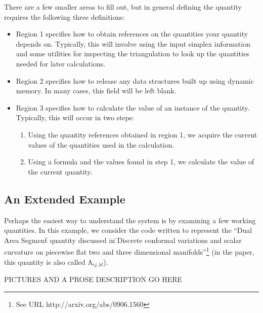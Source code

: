 There are a few smaller areas to fill out, but in general defining the
quantity requires the following three definitions:

\begin{itemize}
\item Region 1 specifies how to obtain references on the quantities your
quantity depends on. Typically, this will involve using the input simplex
information and some utilities for inspecting the triangulation to look up
the quantities needed for later calculations.

\item Region 2 specifies how to release any data structures built up using
dynamic memory. In many cases, this field will be left blank.

\item Region 3 specifies how to calculate the value of an instance of the
quantity. Typically, this will occur in two steps:

\begin{enumerate}
\item Using the quantity references obtained in region 1, we acquire the
current values of the quantities used in the calculation.

\item Using a formula and the values found in step 1, we calculate the value
of the current quantity.
\end{enumerate}
\end{itemize}

\subsection*{An Extended Example}

Perhaps the easiest way to understand the system is by examining a few
working quantities. In this example, we consider the code written to
represent the ``Dual Area Segment\"{} quantity discussed in \"{}Discrete
conformal variations and scalar curvature on piecewise flat two and three
dimensional manifolds''\footnote{%
See URL http://arxiv.org/abs/0906.1560} (in the paper, this quantity is also
called A$_{ij,kl}$).

PICTURES AND A PROSE DESCRIPTION GO HERE

